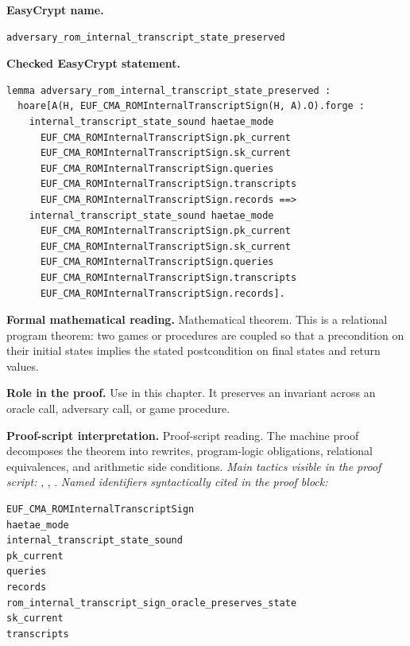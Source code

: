\begin{formaltheorem}
\noindent\textbf{EasyCrypt name.}
\begin{lstlisting}[language=EasyCrypt,basicstyle=\ttfamily\scriptsize]
adversary_rom_internal_transcript_state_preserved
\end{lstlisting}
\noindent\textbf{Checked EasyCrypt statement.}
\begin{lstlisting}[language=EasyCrypt,basicstyle=\ttfamily\scriptsize]
lemma adversary_rom_internal_transcript_state_preserved :
  hoare[A(H, EUF_CMA_ROMInternalTranscriptSign(H, A).O).forge :
    internal_transcript_state_sound haetae_mode
      EUF_CMA_ROMInternalTranscriptSign.pk_current
      EUF_CMA_ROMInternalTranscriptSign.sk_current
      EUF_CMA_ROMInternalTranscriptSign.queries
      EUF_CMA_ROMInternalTranscriptSign.transcripts
      EUF_CMA_ROMInternalTranscriptSign.records ==>
    internal_transcript_state_sound haetae_mode
      EUF_CMA_ROMInternalTranscriptSign.pk_current
      EUF_CMA_ROMInternalTranscriptSign.sk_current
      EUF_CMA_ROMInternalTranscriptSign.queries
      EUF_CMA_ROMInternalTranscriptSign.transcripts
      EUF_CMA_ROMInternalTranscriptSign.records].
\end{lstlisting}
\noindent\textbf{Formal mathematical reading.}
Mathematical theorem. This is a relational program theorem: two games or procedures are coupled so that a precondition on their initial states implies the stated postcondition on final states and return values.

\noindent\textbf{Role in the proof.}
Use in this chapter. It preserves an invariant across an oracle call, adversary call, or game procedure.

\noindent\textbf{Proof-script interpretation.}
Proof-script reading. The machine proof decomposes the theorem into rewrites, program-logic obligations, relational equivalences, and arithmetic side conditions.
\emph{Main tactics visible in the proof script:} , , .
\emph{Named identifiers syntactically cited in the proof block:}
\begin{lstlisting}[language=EasyCrypt,basicstyle=\ttfamily\scriptsize]
EUF_CMA_ROMInternalTranscriptSign
haetae_mode
internal_transcript_state_sound
pk_current
queries
records
rom_internal_transcript_sign_oracle_preserves_state
sk_current
transcripts
\end{lstlisting}

\end{formaltheorem}


